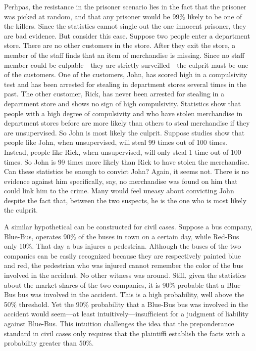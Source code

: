 \documentclass[10pt,dvipsnames,enabledeprecatedfontcommands]{scrartcl}
\begin{document}
Perhpas, the resistance in the prisoner scenario lies in the fact that
the prisoner was picked at random, and that any prisoner would be 99\%
likely to be one of the killers. Since the statistics cannot single out
the one innocent prisoner, they are bad evidence. But consider this
case. Suppose two people enter a department store. There are no other
customers in the store. After they exit the store, a member of the staff
finds that an item of merchandise is missing. Since no staff member
could be culpable---they are strictly surveilled---the culprit must be
one of the customers. One of the customers, John, has scored high in a
compulsivity test and has been arrested for stealing in department
stores several times in the past. The other customer, Rick, has never
been arrested for stealing in a department store and shows no sign of
high compulsivity. Statistics show that people with a high degree of
compulsivity and who have stolen merchandise in department stores before
are more likely than others to steal merchandise if they are
unsupervised. So John is most likely the culprit. Suppose studies show
that people like John, when unsupervised, will steal 99 times out of 100
times. Instead, people like Rick, when unsupervised, will only steal 1
time out of 100 times. So John is 99 times more likely than Rick to have
stolen the merchandise. Can these statistics be enough to convict John?
Again, it seems not. There is no evidence against him specifically, say,
no merchandise was found on him that could link him to the crime. Many
would feel uneasy about convicting John despite the fact that, between
the two suspects, he is the one who is most likely the culprit.

A similar hypothetical can be constructed for civil cases. Suppose a bus
company, Blue-Bus, operates 90\% of the buses in town on a certain day,
while Red-Bus only 10\%. That day a bus injures a pedestrian. Although
the buses of the two companies can be easily recognized because they are
respectively painted blue and red, the pedestrian who was injured cannot
remember the color of the bus involved in the accident. No other witness
was around. Still, given the statistics about the market shares of the
two companies, it is 90\% probable that a Blue-Bus bus was involved in
the accident. This is a high probability, well above the 50\% threshold.
Yet the 90\% probability that a Blue-Bus bus was involved in the
accident would seem---at least intuitively---insufficient for a judgment
of liability against Blue-Bus. This intuition challenges the idea that
the preponderance standard in civil cases only requires that the
plaintiffi establish the facts with a probability greater than 50\%.
\end{document}
